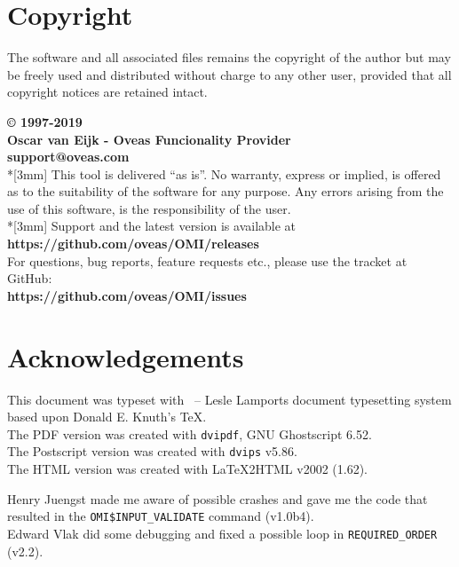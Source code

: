 \documentclass[a4paper]{book}
\newcommand{\vs}{\vspace{3mm}}
\renewcommand{\indent}{\hspace*{5mm}}
\begin{document}
\section*{Copyright}
\label{subsec:copyrightbrary}

The software and all associated files remains the copyright of the author 
but may be freely used and distributed without charge to any other user, 
provided that all copyright notices are retained intact.

\noindent\textbf{{\copyright} 1997-2019\\
Oscar van Eijk - Oveas Funcionality Provider\\
support@oveas.com}\\*[3mm]
This tool is delivered ``as is''. No warranty, express or implied, is 
offered as to the suitability of the software for any purpose. Any errors 
arising from the use of this software, is the responsibility of the user.\\*[3mm]
Support and the latest version is available at \\
\indent\textbf{https://github.com/oveas/OMI/releases} \\
For questions, bug reports, feature requests etc., please use the tracket at GitHub: \\
\indent\textbf{https://github.com/oveas/OMI/issues}

\section*{Acknowledgements}

This document was typeset with \LaTeXe\ -- Lesle Lamports document typesetting system
based upon Donald E. Knuth's \TeX.\\
The PDF version was created with \texttt{dvipdf}, GNU Ghostscript 6.52.\\
The Postscript version was created with \texttt{dvips} v5.86. \\
The HTML version was created with LaTeX2HTML v2002 (1.62).

\vs

Henry Juengst made me aware of possible crashes and gave me the code that
resulted in the \texttt{OMI\$INPUT\_VALIDATE} command (v1.0b4). \\
Edward Vlak did some debugging and fixed a possible loop in \texttt{REQUIRED\_ORDER} (v2.2).
\end{document}
